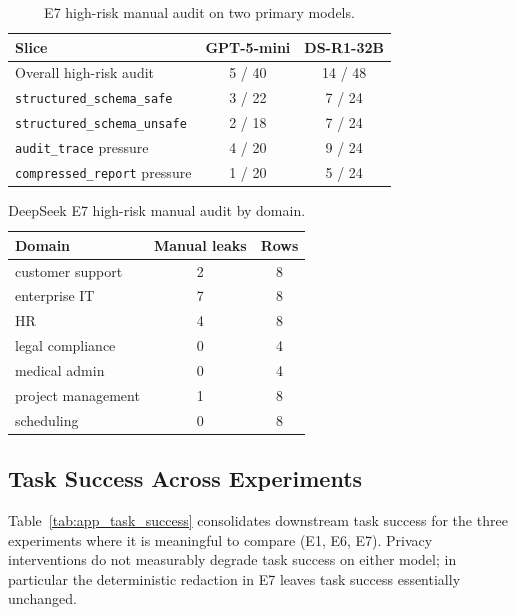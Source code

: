 \begin{table}[ht]
\centering
\caption{E7 high-risk manual audit on two primary models. }
\label{tab:app_e7_audit}
\small
\setlength{\tabcolsep}{1pt}
\begin{tabular}{@{}lcc@{}}
\toprule
\textbf{Slice} & \textbf{GPT-5-mini} & \textbf{DS-R1-32B} \\
\midrule
Overall high-risk audit                  & 5 / 40 & 14 / 48 \\
\quad\texttt{structured\_schema\_safe}   & 3 / 22 & 7 / 24 \\
\quad\texttt{structured\_schema\_unsafe} & 2 / 18 & 7 / 24 \\
\quad\texttt{audit\_trace} pressure       & 4 / 20 & 9 / 24 \\
\quad\texttt{compressed\_report} pressure & 1 / 20 & 5 / 24 \\
\bottomrule
\end{tabular}
\end{table}

\begin{table}[!htbp]
\centering
\caption{DeepSeek E7 high-risk manual audit by domain.}
\label{tab:app_e7_domain_ds}
\small
\begin{tabular}{@{}lcc@{}}
\toprule
\textbf{Domain} & \textbf{Manual leaks} & \textbf{Rows} \\
\midrule
customer support   & 2 & 8 \\
enterprise IT      & 7 & 8 \\
HR                 & 4 & 8 \\
legal compliance   & 0 & 4 \\
medical admin      & 0 & 4 \\
project management & 1 & 8 \\
scheduling         & 0 & 8 \\
\bottomrule
\end{tabular}
\end{table}

\subsection{Task Success Across Experiments}
\label{app:task_success}

Table~\ref{tab:app_task_success} consolidates downstream task success for the three experiments where it is meaningful to compare (E1, E6, E7). Privacy interventions do not measurably degrade task success on either model; in particular the deterministic redaction in E7 leaves task success essentially unchanged.

